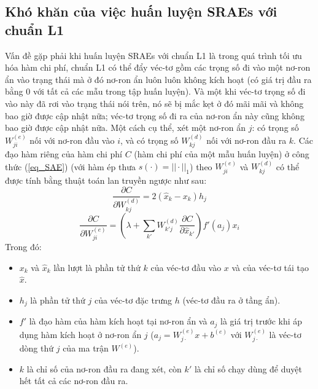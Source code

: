 \subsection{Khó khăn của việc huấn luyện SRAEs với chuẩn L1}
Vấn đề gặp phải khi huấn luyện SRAEs với chuẩn L1 là trong quá trình tối ưu hóa hàm chi phí, chuẩn L1 có thể đẩy véc-tơ gồm các trọng số đi vào một nơ-ron ẩn vào trạng thái mà ở đó nơ-ron ẩn luôn luôn không kích hoạt (có giá trị đầu ra bằng 0 với tất cả các mẫu trong tập huấn luyện). Và một khi véc-tơ trọng số đi vào này đã rơi vào trạng thái nói trên, nó sẽ bị mắc kẹt ở đó mãi mãi và không bao giờ được cập nhật nữa; véc-tơ trọng số đi ra của nơ-ron ẩn này cũng không bao giờ được cập nhật nữa. Một cách cụ thể, xét một nơ-ron ẩn $j$: có trọng số $W^{(e)}_{ji}$ nối với nơ-ron đầu vào $i$, và có trọng số $W^{(d)}_{kj}$ nối với nơ-ron đầu ra $k$. Các đạo hàm riêng của hàm chi phí $C$ (hàm chi phí của một mẫu huấn luyện) ở công thức (\ref{eq_SAE}) (với hàm ép thưa $s(\cdot)=||\cdot||_1$) theo $W^{(e)}_{ji}$ và $W^{(d)}_{kj}$ có thể được tính bằng thuật toán lan truyền ngược như sau:
\begin{equation}
	\frac{\partial C}{\partial W^{(d)}_{kj}} = 2(\hat{x}_k - x_k)h_j
	\label{eq_grad1_SAE}
\end{equation}
\begin{equation}
	\frac{\partial C}{\partial W^{(e)}_{ji}} = (\lambda + \sum_{k'} W^{(d)}_{k'j}\frac{\partial C}{\partial \hat{x}_{k'}})f'(a_j)x_i
	\label{eq_grad2_SAE}
\end{equation}
Trong đó:
\begin{itemize}
	\item $x_k$ và $\hat{x}_k$ lần lượt là phần tử thứ $k$ của véc-tơ đầu vào $x$ và của véc-tơ tái tạo $\hat{x}$.
	\item $h_j$ là phần tử thứ $j$ của véc-tơ đặc trưng $h$ (véc-tơ đầu ra ở tầng ẩn).
	\item $f'$ là đạo hàm của hàm kích hoạt tại nơ-ron ẩn và $a_j$ là giá trị trước khi áp dụng hàm kích hoạt ở nơ-ron ẩn $j$ ($a_j = W^{(e)}_{j\cdot}x + b^{(e)}$ với $W^{(e)}_{j\cdot}$ là véc-tơ dòng thứ $j$ của ma trận $W^{(e)}$).
	\item $k$ là chỉ số của nơ-ron đầu ra đang xét, còn $k'$ là chỉ số chạy dùng để duyệt hết tất cả các nơ-ron đầu ra.
\end{itemize}
